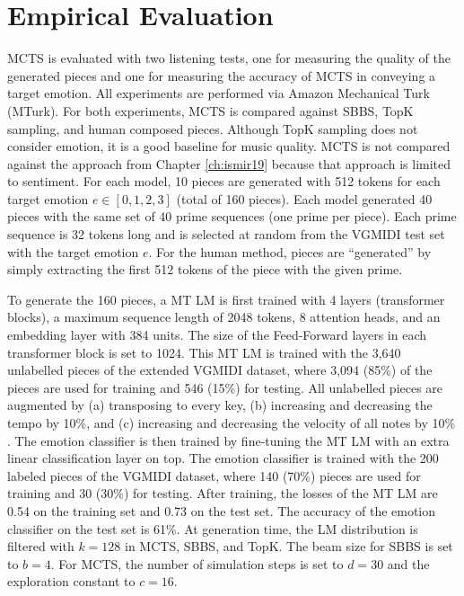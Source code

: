 \section{Empirical Evaluation}

MCTS is evaluated with two listening tests, one for measuring the quality of the generated pieces and one for measuring the accuracy of MCTS in conveying a target emotion. All experiments are performed via Amazon Mechanical Turk (MTurk). For both experiments, MCTS is compared against SBBS, TopK sampling, and human composed pieces. Although TopK sampling does not consider emotion, it is a good baseline for music quality. MCTS is not compared against the approach from Chapter \ref{ch:ismir19} because that approach is limited to sentiment. For each model, 10 pieces are generated with 512 tokens for each target emotion $e \in [0, 1, 2, 3]$ (total of 160 pieces). Each model generated 40 pieces with the same set of 40 prime sequences (one prime per piece). Each prime sequence is 32 tokens long and is selected at random from the VGMIDI test set with the target emotion $e$. For the human method, pieces are ``generated'' by simply extracting the first 512 tokens of the piece with the given prime.

To generate the 160 pieces, a MT LM is first trained with 4 layers (transformer blocks), a maximum sequence length of 2048 tokens, 8 attention heads, and an embedding layer with 384 units. The size of the Feed-Forward layers in each transformer block is set to 1024. This MT LM is trained with the 3,640 unlabelled pieces of the extended VGMIDI dataset, where 3,094 (85\%) of the pieces are used for training and 546 (15\%) for testing. All unlabelled pieces are augmented by (a) transposing to every key, (b) increasing and decreasing the tempo by 10\%, and (c) increasing and decreasing the velocity of all notes by 10\% \cite{oore2017learning}. The emotion classifier is then trained by fine-tuning the MT LM with an extra linear classification layer on top. The emotion classifier is trained with the 200 labeled pieces of the VGMIDI dataset, where 140 (70\%) pieces are used for training and 30 (30\%) for testing. After training, the losses of the MT LM are 0.54 on the training set and 0.73 on the test set. The accuracy of the emotion classifier on the test set is 61\%. At generation time, the LM distribution is filtered with $k = 128$ in MCTS, SBBS, and TopK. The beam size for SBBS is set to $b = 4$. For MCTS, the number of simulation steps is set to $d = 30$ and the exploration constant to $c = 16$.

